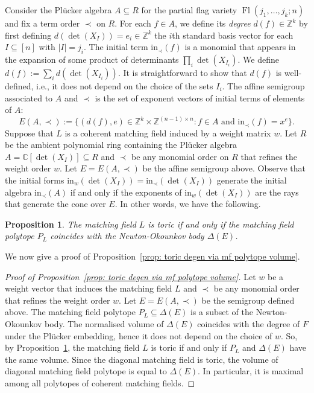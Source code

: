 \documentclass[11pt]{article}
\newcommand{\CC}{\mathbb C}
\newcommand{\ZZ}{\mathbb Z}
\newcommand{\init}{\text{in}}
\DeclareMathOperator{\Fl}{Fl}
\theoremstyle{plain}
\newtheorem{proposition}[theorem]{Proposition}
\theoremstyle{definition}
\theoremstyle{remark}
\begin{document}
Consider the Pl\"ucker algebra $A \subseteq R$ for the partial flag variety $\Fl(j_1, \dots, j_k; n)$ and fix a term order $\prec$ on $R$. For each $f \in A$, we define its \textit{degree} $d(f) \in \ZZ^k$ by first defining $d(\det(X_I)) = e_i \in \ZZ^k$ the $i$th standard basis vector for each $I \subseteq [n]$ with $|I| = j_i$. The initial term $\init_\prec(f)$ is a monomial that appears in the expansion of some product of determinants $\prod_i \det(X_{I_i})$. We define $d(f) := \sum_i d(\det(X_{I_i}))$. It is straightforward to show that $d(f)$ is well-defined, i.e., it does not depend on the choice of the sets $I_i$.
The affine semigroup associated to $A$ and $\prec$ is the set of exponent vectors of initial terms of elements of $A$:
\[
E(A, \prec) := \{(d(f), e) \in \ZZ^k \times \ZZ^{(n-1) \times n} \colon f \in A \text{ and } \init_\prec(f) = x^e\}.
\]
Suppose that $L$ is a coherent matching field induced by a weight matrix $w$. Let $R$ be the ambient polynomial ring containing the Pl\"ucker algebra $A = \CC[\det(X_I)] \subseteq R$ and $\prec$ be any monomial order on $R$ that refines the weight order $w$. Let $E = E(A, \prec)$ be the affine semigroup above. Observe that the initial forms $\init_w(\det(X_I)) = \init_\prec(\det(X_I))$ generate the initial algebra $\init_\prec(A)$ if and only if the exponents of $\init_w(\det(X_I))$ are the rays that generate the cone over $E$. In other words, we have the following.

\begin{proposition}\label{prop: toric degen via NO body}
    The matching field $L$ is toric if and only if the matching field polytope $P_L$ coincides with the Newton-Okounkov body $\Delta(E)$.
\end{proposition}

We now give a proof of Proposition~\ref{prop: toric degen via mf polytope volume}.

\begin{proof}[Proof of Proposition~\ref{prop: toric degen via mf polytope volume}]
    Let $w$ be a weight vector that induces the matching field $L$ and $\prec$ be any monomial order that refines the weight order $w$. Let $E = E(A, \prec)$ be the semigroup defined above. The matching field polytope $P_L \subseteq \Delta(E)$ is a subset of the Newton-Okounkov body. The normalised volume of $\Delta(E)$ coincides with the degree of $F$ under the Pl\"ucker embedding,  hence it does not depend on the choice of $w$. So, by Proposition~\ref{prop: toric degen via NO body}, the matching field $L$ is toric if and only if $P_L$ and $\Delta(E)$ have the same volume. Since the diagonal matching field is toric, the volume of diagonal matching field polytope is equal to $\Delta(E)$. In particular, it is maximal among all polytopes of coherent matching fields.
\end{proof}
\end{document}
